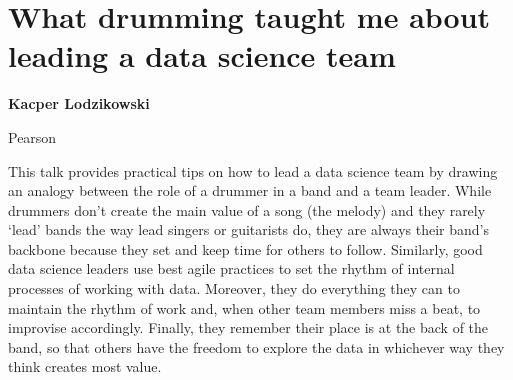 \documentclass[\main/boa.tex]{subfiles}
\begin{document}
\section{What drumming taught me about leading a data science team}

\begin{minipage}{0.915\textwidth}
	\centering
  {\bf {} Kacper Lodzikowski}
\end{minipage}

\vskip 0.3cm

\begin{affiliations}
\begin{minipage}{0.915\textwidth}
\centering
Pearson  \\[-2pt]
\end{minipage}
\end{affiliations}

\vskip 0.8cm

 This talk provides practical tips on how to lead a data science team by drawing an analogy between the role of a drummer in a band and a team leader. While drummers don’t create the main value of a song (the melody) and they rarely ‘lead’ bands the way lead singers or guitarists do, they are always their band’s backbone because they set and keep time for others to follow. Similarly, good data science leaders use best agile practices to set the rhythm of internal processes of working with data. Moreover, they do everything they can to maintain the rhythm of work and, when other team members miss a beat, to improvise accordingly. Finally, they remember their place is at the back of the band, so that others have the freedom to explore the data in whichever way they think creates most value. 
\end{document}
